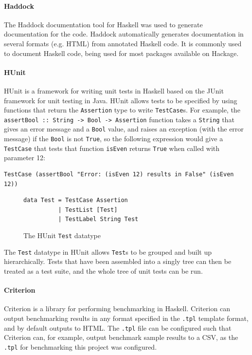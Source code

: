\documentclass[12pt,a4paper,twoside,openright]{report}
\begin{document}
\paragraph{Haddock}{
The Haddock documentation tool for Haskell was used to generate documentation
for the code. Haddock automatically generates documentation in
several formats (e.g. HTML) from annotated Haskell code. It is commonly
used to document Haskell code, being used for most packages available
on Hackage.
}

\paragraph{HUnit}{
HUnit is a framework for writing unit tests in Haskell based on the JUnit framework
for unit testing in Java. HUnit allows tests to be specified by using functions
that return the \verb,Assertion, type to write \verb,TestCase,s. For example, the
\verb,assertBool :: String -> Bool -> Assertion, function takes a \verb,String,
that gives an error message and a \verb,Bool, value, and raises an exception (with
the error message) if the \verb,Bool, is not \verb,True,, so the following
expression would give a \verb,TestCase, that tests that function
\verb,isEven, returns \verb,True, when called with parameter 12:
\begin{lstlisting}
TestCase (assertBool "Error: (isEven 12) results in False" (isEven 12))
\end{lstlisting}
\begin{figure}[h]
\centering
\begin{lstlisting}
data Test = TestCase Assertion
          | TestList [Test]
          | TestLabel String Test
\end{lstlisting}
\caption{The HUnit {\tt Test} datatype}
\end{figure}

The \verb,Test, datatype in HUnit allows \verb,Test,s to be grouped
and built up hierarchically. Tests that have been assembled into a
singly tree can then be treated as a test suite, and the whole tree
of unit tests can be run.}

\paragraph{Criterion}{
Criterion is a library for performing benchmarking in Haskell.
Criterion can output benchmarking results in any format specified in the \verb,.tpl,
template format, and by default outputs to HTML.
The \verb,.tpl, file can be configured such that
Criterion can, for example, output benchmark sample results to a CSV, as the
\verb,.tpl, for benchmarking this project was configured.}
\end{document}
